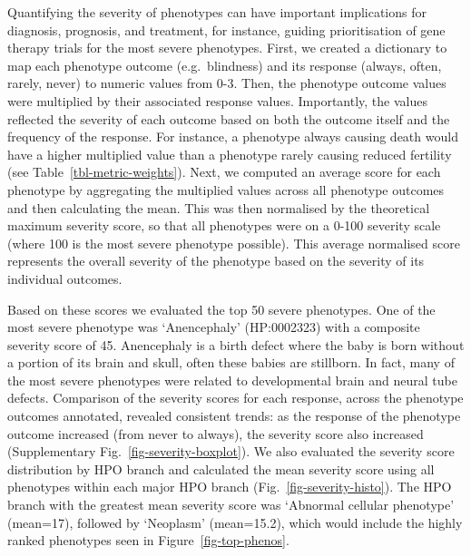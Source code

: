 \documentclass[
]{agujournal2019}
\begin{document}
Quantifying the severity of phenotypes can have important implications
for diagnosis, prognosis, and treatment, for instance, guiding
prioritisation of gene therapy trials for the most severe phenotypes.
First, we created a dictionary to map each phenotype outcome
(e.g.~blindness) and its response (always, often, rarely, never) to
numeric values from 0-3. Then, the phenotype outcome values were
multiplied by their associated response values. Importantly, the values
reflected the severity of each outcome based on both the outcome itself
and the frequency of the response. For instance, a phenotype always
causing death would have a higher multiplied value than a phenotype
rarely causing reduced fertility (see Table~\ref{tbl-metric-weights}).
Next, we computed an average score for each phenotype by aggregating the
multiplied values across all phenotype outcomes and then calculating the
mean. This was then normalised by the theoretical maximum severity
score, so that all phenotypes were on a 0-100 severity scale (where 100
is the most severe phenotype possible). This average normalised score
represents the overall severity of the phenotype based on the severity
of its individual outcomes.

Based on these scores we evaluated the top 50 severe phenotypes. One of
the most severe phenotype was `Anencephaly' (HP:0002323) with a
composite severity score of 45. Anencephaly is a birth defect where the
baby is born without a portion of its brain and skull, often these
babies are stillborn. In fact, many of the most severe phenotypes were
related to developmental brain and neural tube defects. Comparison of
the severity scores for each response, across the phenotype outcomes
annotated, revealed consistent trends: as the response of the phenotype
outcome increased (from never to always), the severity score also
increased (Supplementary Fig.~\ref{fig-severity-boxplot}). We also
evaluated the severity score distribution by HPO branch and calculated
the mean severity score using all phenotypes within each major HPO
branch (Fig.~\ref{fig-severity-histo}). The HPO branch with the greatest
mean severity score was `Abnormal cellular phenotype' (mean=17),
followed by `Neoplasm' (mean=15.2), which would include the highly
ranked phenotypes seen in Figure~\ref{fig-top-phenos}.
\end{document}
